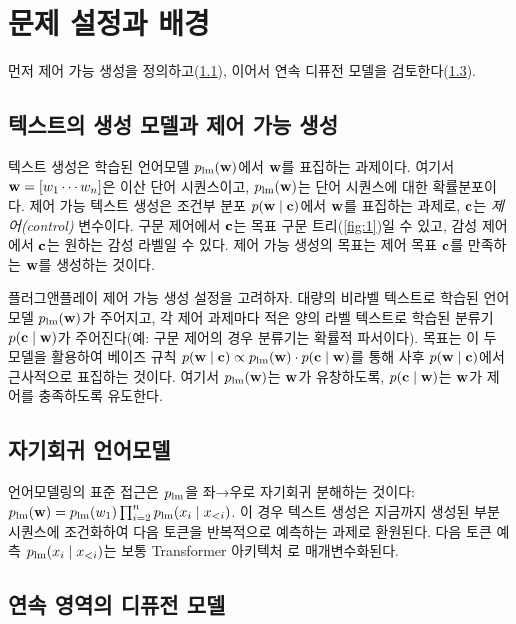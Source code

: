 
\newcommand{\xxtheta}{f_\theta}
\section{문제 설정과 배경}
\label{sec:background}

먼저 제어 가능 생성을 정의하고(\cref{ssec:control_setup}), 이어서 연속 디퓨전 모델을 검토한다(\cref{ssec:diffusion_setup}).

\subsection{텍스트의 생성 모델과 제어 가능 생성}
\label{ssec:control_setup}
텍스트 생성은 학습된 언어모델 $p_\text{lm} (\mathbf{w})$에서 $\mathbf{w}$를 표집하는 과제이다. 여기서 $\mathbf{w} = [w_1 \cdots w_n]$은 이산 단어 시퀀스이고, $p_\text{lm} (\mathbf{w})$는 단어 시퀀스에 대한 확률분포이다. 제어 가능 텍스트 생성은 조건부 분포 $p(\mathbf{w} \mid \mathbf{c})$에서 $\mathbf{w}$를 표집하는 과제로, $\mathbf{c}$는 \emph{제어(control)} 변수이다. 구문 제어에서 $\mathbf{c}$는 목표 구문 트리(\cref{fig:1})일 수 있고, 감성 제어에서 $\mathbf{c}$는 원하는 감성 라벨일 수 있다. 제어 가능 생성의 목표는 제어 목표 $\mathbf{c}$를 만족하는 $\mathbf{w}$를 생성하는 것이다.

플러그앤플레이 제어 가능 생성 설정을 고려하자. 대량의 비라벨 텍스트로 학습된 언어모델 $p_\text{lm}(\mathbf{w})$가 주어지고, 각 제어 과제마다 적은 양의 라벨 텍스트로 학습된 분류기 $p(\mathbf{c} \mid \mathbf{w})$가 주어진다(예: 구문 제어의 경우 분류기는 확률적 파서이다). 목표는 이 두 모델을 활용하여 베이즈 규칙 $p(\mathbf{w} \mid \mathbf{c}) \propto p_\text{lm}(\mathbf{w}) \cdot p(\mathbf{c} \mid \mathbf{w})$를 통해 사후 $p(\mathbf{w} \mid \mathbf{c})$에서 근사적으로 표집하는 것이다. 여기서 $p_\text{lm}(\mathbf{w})$는 $\mathbf{w}$가 유창하도록, $p(\mathbf{c} \mid \mathbf{w})$는 $\mathbf{w}$가 제어를 충족하도록 유도한다.






\subsection{자기회귀 언어모델}
언어모델링의 표준 접근은 $p_\text{lm}$을 좌→우로 자기회귀 분해하는 것이다: $p_\text{lm}(\mathbf{w}) = p_\text{lm}(w_1) \prod_{i=2}^n p_\text{lm}(x_i \mid x_{<i})$. 이 경우 텍스트 생성은 지금까지 생성된 부분 시퀀스에 조건화하여 다음 토큰을 반복적으로 예측하는 과제로 환원된다. 다음 토큰 예측 $p_\text{lm}(x_i \mid x_{<i})$는 보통 Transformer 아키텍처 \cite{Vaswani2017Attn}로 매개변수화된다.

\subsection{연속 영역의 디퓨전 모델}
\label{ssec:diffusion_setup}

